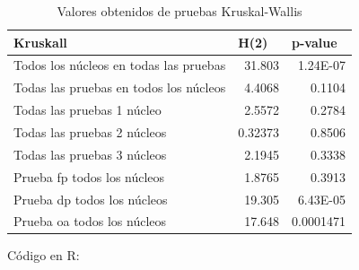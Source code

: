 \documentclass{article}
\begin{document}
\begin{table}[h!]
\centering
\caption{Valores obtenidos de pruebas Kruskal-Wallis}
\label{tablakrus}
\begin{tabular}{|l|r|r|}
\hline
Kruskall & \multicolumn{1}{l|}{H(2)} & \multicolumn{1}{l|}{p-value} \\ \hline
Todos los núcleos en todas las pruebas & 31.803 & 1.24E-07 \\ \hline
Todas las pruebas en todos los núcleos & 4.4068 & 0.1104 \\ \hline
Todas las pruebas 1 núcleo & 2.5572 & 0.2784 \\ \hline
Todas las pruebas 2 núcleos & 0.32373 & 0.8506 \\ \hline
Todas las pruebas 3 núcleos & 2.1945 & 0.3338 \\ \hline
Prueba fp todos los núcleos & 1.8765 & 0.3913 \\ \hline
Prueba dp todos los núcleos & 19.305 & 6.43E-05 \\ \hline
Prueba oa todos los núcleos & 17.648 & 0.0001471 \\ \hline
\end{tabular}
\end{table}

Código en R:
\end{document}
